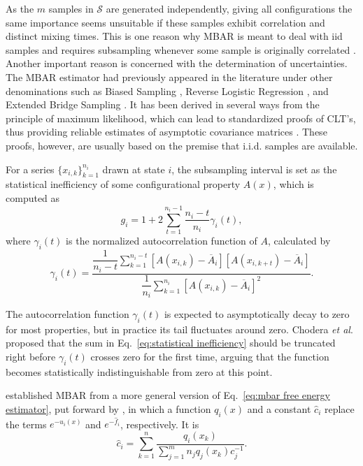 \documentclass[journal=jctcce,manuscript=article]{achemso}
\newcommand{\avg}[1]{\overline{#1}}             %
\begin{document}
As the $m$ samples in $\mathcal S$ are generated independently, giving all configurations the same importance seems unsuitable if these samples exhibit correlation and distinct mixing times. This is one reason why MBAR is meant to deal with iid samples and requires subsampling whenever some sample is originally correlated \cite{Shirts_2008}. Another important reason is concerned with the determination of uncertainties. The MBAR estimator had previously appeared in the literature under other denominations such as Biased Sampling \cite{Vardi_1985, Gill_1988}, Reverse Logistic Regression \cite{Geyer_1994}, and Extended Bridge Sampling \cite{Meng_1996, Kong_2003, Tan_2004}. It has been derived in several ways from the principle of maximum likelihood, which can lead to standardized proofs of CLT's, thus providing reliable estimates of asymptotic covariance matrices \cite{Pawitan_2001, Greene_2012}. These proofs, however, are usually based on the premise that i.i.d. samples are available.

For a series $\{x_{i,k}\}_{k=1}^{n_i}$ drawn at state $i$, the subsampling interval is set as the statistical inefficiency of some configurational property $A(x)$, which is computed as\cite{Chodera_2007}
\begin{equation}
\label{eq:statistical inefficiency}
g_i = 1 + 2 \sum\limits_{t=1}^{n_i-1} \frac{n_i - t}{n_i} \gamma_i(t),
\end{equation}
where $\gamma_i(t)$ is the normalized autocorrelation function of $A$, calculated by
\begin{equation*}
\gamma_i(t) = \frac{\dfrac{1}{n_i - t} \sum\limits_{k=1}^{n_i-t} \left[A(x_{i,k}) - \avg A_i\right]\left[A(x_{i,k+t}) - \avg A_i\right]}{\dfrac{1}{n_i} \sum\limits_{k=1}^{n_i} \left[A(x_{i,k}) - \avg A_i\right]^2}.
\end{equation*}

The autocorrelation function $\gamma_i(t)$ is expected to asymptotically decay to zero for most properties, but in practice its tail fluctuates around zero. Chodera \textit{et al}.\cite{Chodera_2007} proposed that the sum in Eq.~\eqref{eq:statistical inefficiency} should be truncated right before $\gamma_i(t)$ crosses zero for the first time, arguing that the function becomes statistically indistinguishable from zero at this point.

\citeauthor{Shirts_2008} \cite{Shirts_2008} established MBAR from a more general version of Eq.~\eqref{eq:mbar free energy estimator}, put forward by \citeauthor{Kong_2003} \cite{Kong_2003}, in which a function $q_i(x)$ and a constant $\hat c_i$ replace the terms $e^{-u_i(x)}$ and $e^{-\hat f_i}$, respectively. It is
\begin{equation}
\label{eq:mbar general estimator}
{\hat c}_i = \sum_{k=1}^n \frac{q_i(x_k)}{\sum_{j=1}^m n_j q_j(x_k) c_j^{-1}}.
\end{equation}
\end{document}
